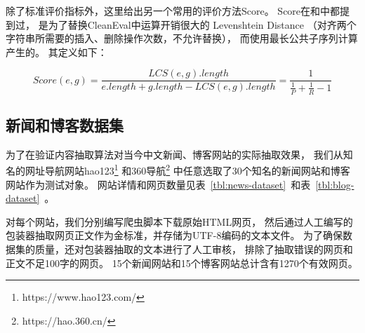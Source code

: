 除了标准评价指标外，这里给出另一个常用的评价方法Score。
Score在\cite{sun2011dom}和\cite{wu2013web}中都提到过，
是为了替换CleanEval中运算开销很大的
Levenshtein Distance
（对齐两个字符串所需要的插入、删除操作次数，不允许替换），
而使用最长公共子序列计算产生的。
其定义如下：

\begin{equation}
Score(e,g) = \frac{LCS(e,g).length}{e.length + g.length - LCS(e,g).length}
= \frac{1}{\frac{1}{P} + \frac{1}{R} - 1}
\end{equation}

\subsection{新闻和博客数据集}

为了在验证内容抽取算法对当今中文新闻、博客网站的实际抽取效果，
我们从知名的网址导航网站hao123\footnote{https://www.hao123.com/}
和360导航\footnote{https://hao.360.cn/}
中任意选取了30个知名的新闻网站和博客网站作为测试对象。
网站详情和网页数量见表~\ref{tbl:news-dataset}~和表~\ref{tbl:blog-dataset}~。

对每个网站，我们分别编写爬虫脚本下载原始HTML网页，
然后通过人工编写的包装器抽取网页正文作为金标准，并存储为UTF-8编码的文本文件。
为了确保数据集的质量，还对包装器抽取的文本进行了人工审核，
排除了抽取错误的网页和正文不足100字的网页。
15个新闻网站和15个博客网站总计含有1270个有效网页。

